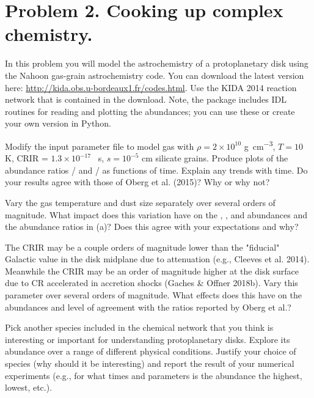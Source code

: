 \documentclass[11pt]{article}
\newenvironment{tight_enumerate}{
    \begin{enumerate}[label=(\alph*)]
    \setlength{\itemsep}{3pt}
    \setlength{\parskip}{0pt}}
    {\end{enumerate}}
\begin{document}
\newpage
\section*{Problem 2. Cooking up complex chemistry.}
In this problem you will model the astrochemistry of a protoplanetary disk using the Nahoon gas-grain astrochemistry code. You can download the latest version here: \url{http://kida.obs.u-bordeaux1.fr/codes.html}. Use the KIDA 2014 reaction network that is contained in the download. Note, the package includes IDL routines for reading and plotting the abundances; you can use these or create your own version in Python.

\begin{tight_enumerate}
\item Modify the input parameter file to model gas with $\rho = 2\times10^{10}$ \si{\gram\per\cubic\centi\meter}, $T = 10$ \si{\kelvin}, CRIR = $1.3\times10^{-17}$ \si{\per\second}, $s = 10^{-5}$ \si{\centi\meter} silicate grains. Produce plots of the abundance ratios / and / as functions of time. Explain any trends with time. Do your results agree with those of Oberg et al. (2015)? Why or why not?

\item Vary the gas temperature and dust size separately over several orders of magnitude. What impact does this variation have on the , , and  abundances and the abundance ratios in (a)? Does this agree with your expectations and why?

\item The CRIR may be a couple orders of magnitude lower than the "fiducial" Galactic value in the disk midplane due to attenuation (e.g., Cleeves et al. 2014). Meanwhile the CRIR may be an order of magnitude higher at the disk surface due to CR accelerated in accretion shocks (Gaches \& Offner 2018b). Vary this parameter over several orders of magnitude. What effects does this have on the abundances and level of agreement with the ratios reported by Oberg et al.?

\item Pick another species included in the chemical network that you think is interesting or important for understanding protoplanetary disks. Explore its abundance over a range of different physical conditions. Justify your choice of species (why should it be interesting) and report the result of your numerical experiments (e.g., for what times and parameters is the abundance the highest, lowest, etc.).
\end{tight_enumerate}
\end{document}
